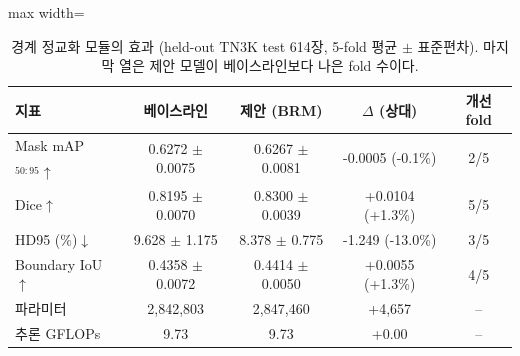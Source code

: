 \begin{table}[htbp]
\centering
\small
\caption[경계 정교화 모듈의 효과 (held-out TN3K test 614장, 5-fold 평균 $\pm$ 표준편차).]{경계 정교화 모듈의 효과 (held-out TN3K test 614장, 5-fold 평균 $\pm$ 표준편차). 마지막 열은 제안 모델이 베이스라인보다 나은 fold 수이다.}
\label{tab:brm_main}
\begin{adjustbox}{max width=\linewidth}
\begin{tabular}{lcccc}
\toprule
지표 & 베이스라인 & 제안 (BRM) & $\Delta$ (상대) & 개선 fold \\
\midrule
Mask mAP$_{50:95}\uparrow$ & 0.6272 $\pm$ 0.0075 & 0.6267 $\pm$ 0.0081 & -0.0005 (-0.1\%) & 2/5 \\
Dice$\uparrow$ & 0.8195 $\pm$ 0.0070 & 0.8300 $\pm$ 0.0039 & +0.0104 (+1.3\%) & 5/5 \\
HD95 (\%)$\downarrow$ & 9.628 $\pm$ 1.175 & 8.378 $\pm$ 0.775 & -1.249 (-13.0\%) & 3/5 \\
Boundary IoU$\uparrow$ & 0.4358 $\pm$ 0.0072 & 0.4414 $\pm$ 0.0050 & +0.0055 (+1.3\%) & 4/5 \\
\midrule
파라미터 & 2,842,803 & 2,847,460 & +4,657 & -- \\
추론 GFLOPs & 9.73 & 9.73 & +0.00 & -- \\
\bottomrule
\end{tabular}
\end{adjustbox}
\end{table}
